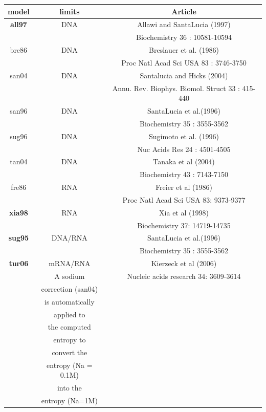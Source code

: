 \documentclass{article}
\begin{document}
\begin{table}[hc]
\begin{tabular}[h]{| c | c | c |}
\textbf{model} & \textbf{limits} & \textbf{Article} \\ 
\hline
\textbf{all97} & DNA & Allawi and SantaLucia (1997) \\
 & & Biochemistry 36 : 10581-10594 \\
 \hline
bre86 & DNA & Breslauer et al. (1986) \\
 & & Proc Natl Acad Sci USA 83 : 3746-3750 \\
 \hline
san04 & DNA & Santalucia and Hicks (2004) \\
 & & Annu. Rev. Biophys. Biomol. Struct 33 : 415-440 \\
 \hline
san96 & DNA & SantaLucia et al.(1996) \\
 & & Biochemistry 35 : 3555-3562 \\
 \hline
sug96 & DNA & Sugimoto et al. (1996)\\
 & & Nuc Acids Res 24 : 4501-4505 \\
 \hline
tan04 & DNA & Tanaka et al (2004)\\
 & & Biochemistry 43 : 7143-7150  \\
 \hline
fre86 & RNA & Freier et al (1986) \\
 & & Proc Natl Acad Sci USA 83: 9373-9377 \\
 \hline
\textbf{xia98} & RNA & Xia et al (1998) \\
 & & Biochemistry 37: 14719-14735 \\
 \hline
\textbf{sug95} & DNA/RNA & SantaLucia et al.(1996) \\
 & & Biochemistry 35 : 3555-3562 \\
 \hline
\textbf{tur06} & mRNA/RNA & Kierzeck et al (2006) \\
 & A sodium & Nucleic acids research 34: 3609-3614 \\
 & correction (san04) & \\
 & is automatically & \\
 & applied to & \\
 & the computed & \\
 & entropy to & \\
 & convert the & \\
 & entropy (Na = 0.1M)&\\
 & into the & \\
 & entropy (Na=1M) & \\
 \hline
\end{tabular}
\end{table}
\end{document}
